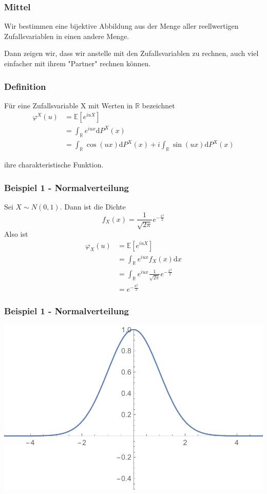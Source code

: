 \documentclass{beamer}
\newcommand{\R}{\mathbb{R}}
\newcommand{\E}{\mathbb{E}}
\newcommand\dint{\mathord{\mathrm{d}}}
\begin{document}
\begin{frame}
\frametitle{Mittel}
Wir bestimmen eine bijektive Abbildung aus der Menge aller reellwertigen Zufallsvariablen in einen andere Menge.

Dann zeigen wir, dass wir anstelle mit den Zufallsvariablen zu rechnen, auch viel einfacher mit ihrem "Partner" rechnen können.
\end{frame}

\begin{frame}
\frametitle{Definition}
Für eine Zufallsvariable X mit Werten in $\R$ bezeichnet
\begin{align} \label{eq1}
\varphi^X(u) &= \E[e^{iuX}] \\
 & = \int_{\R} e^{iux} \dint P^X(x)\\
 & = \int_{\R} \cos(ux) \dint P^X(x) + i \int_{\R} \sin(ux) \dint P^X(x)
\end{align}

ihre charakteristische Funktion.

\end{frame}

\begin{frame}
\frametitle{Beispiel 1 - Normalverteilung}
Sei $X \sim N(0,1)$. Dann ist die Dichte
{\footnotesize
$$ f_X(x) = \frac{1}{\sqrt{2 \pi}} e^{-\frac{x^2}{2}} $$
}%
Also ist
{\footnotesize
\begin{align*}
\varphi_X(u) &= \E[e^{iuX}]\\
&= \int_\R e^{iux}f_X(x) \dint x\\
&= \int_\R e^{iux} \frac{1}{\sqrt{2 \pi}} e^{-\frac{x^2}{2}}\\
&= e^{-\frac{u^2}{2}}
\end{align*}
}%
\end{frame}

\begin{frame}
\frametitle{Beispiel 1 - Normalverteilung}
\includegraphics[width=\linewidth, height=\textheight,keepaspectratio]{presentation/plots/normal_char.pdf}
\end{frame}
\end{document}
